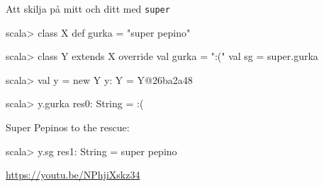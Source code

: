 \begin{Slide}{Att skilja på mitt och ditt med \texttt{super}}
\begin{REPL}
scala> class X { def gurka = "super pepino" }

scala> class Y extends X {
         override val gurka = ":("
         val sg = super.gurka
       }

scala> val y = new Y
y: Y = Y@26ba2a48

scala> y.gurka
res0: String = :(
\end{REPL}

\pause
Super Pepinos to the rescue:
\begin{REPLnonum}
scala> y.sg
res1: String = super pepino

\end{REPLnonum}


\pause
{}
\href{https://youtu.be/NPhjiXskz34}{\small https://youtu.be/NPhjiXskz34}
\end{Slide}





